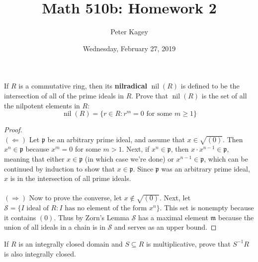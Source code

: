 \documentclass{article}
\newenvironment{problem}[2][Problem]{\begin{trivlist}
\item[\hskip \labelsep {\bfseries #1}\hskip \labelsep {\bfseries #2.}]}{\end{trivlist}}
\newcommand{\set}[1]{\{ #1 \}}
\begin{document}
\title{Math 510b: Homework 2}
\author{Peter Kagey}
\date{Wednesday, February 27, 2019}

\maketitle

\begin{problem}{5.57 (Rotman)} %
  If $R$ is a commutative ring, then its \textbf{nilradical}
  $\operatorname{nil}(R)$ is defined to be the intersection of all of the prime
  ideals in $R$. Prove that $\operatorname{nil}(R)$ is the set of all the
  nilpotent elements in $R$: \[
    \operatorname{nil}(R) = \set{r \in R : r^m = 0 \text{ for some } m \geq 1}
  \]
\end{problem}

\begin{proof} ~ \\
  $(\Longleftarrow)$ Let $\mathfrak p$ be an arbitrary prime ideal, and assume
  that $x \in \sqrt{(0)}$. Then $x^n \in \mathfrak p$ because $x^m = 0$ for some
  $m > 1$. Next, if $x^n \in \mathfrak p$, then $x \cdot x^{n-1} \in \mathfrak p$,
  meaning that either $x \in \mathfrak p$ (in which case we're done) or
  $x^{n-1} \in \mathfrak p$, which can be continued by induction to show that
  $x \in \mathfrak p$. Since $\mathfrak p$ was an arbitrary prime ideal, $x$ is
  in the intersection of all prime ideals.
  \\~\\ %
  $(\Longrightarrow)$ Now to prove the converse, let $x \not\in \sqrt{(0)}$.
  Next, let $\mathcal S = \set{I \text{ ideal of } R : I \text{ has no element of the form } x^n}$.
  This set is nonempty because it contains $(0)$.
  Thus by Zorn's Lemma $\mathcal S$ has a maximal element $\mathfrak m$ because
  the union of all ideals in a chain is in $\mathcal S$ and serves as an upper
  bound.
\end{proof}
\pagebreak
\begin{problem}{10.27 (Rotman)} %
  If $R$ is an integrally closed domain and $S \subseteq R$ is multiplicative,
  prove that $S^{-1}R$ is also integrally closed.
\end{problem}
\end{document}
